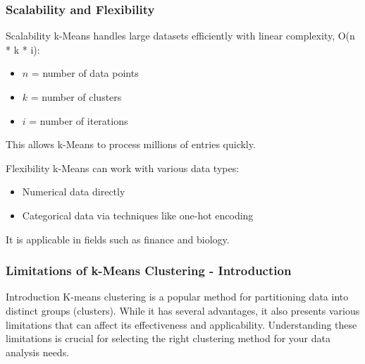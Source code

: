 \documentclass[aspectratio=169]{beamer}
\begin{document}
\begin{frame}[fragile]
    \frametitle{Scalability and Flexibility}
    
    \begin{block}{Scalability}
        k-Means handles large datasets efficiently with linear complexity, O(n * k * i):
        \begin{itemize}
            \item $n$ = number of data points
            \item $k$ = number of clusters
            \item $i$ = number of iterations
        \end{itemize}
        This allows k-Means to process millions of entries quickly.
    \end{block}
    
    \begin{block}{Flexibility}
        k-Means can work with various data types:
        \begin{itemize}
            \item Numerical data directly
            \item Categorical data via techniques like one-hot encoding
        \end{itemize}
        It is applicable in fields such as finance and biology.
    \end{block}
\end{frame}

\begin{frame}[fragile]
    \frametitle{Limitations of k-Means Clustering - Introduction}
    \begin{block}{Introduction}
        K-means clustering is a popular method for partitioning data into distinct groups (clusters).
        While it has several advantages, it also presents various limitations that can affect its effectiveness and applicability. 
        Understanding these limitations is crucial for selecting the right clustering method for your data analysis needs.
    \end{block}
\end{frame}
\end{document}
